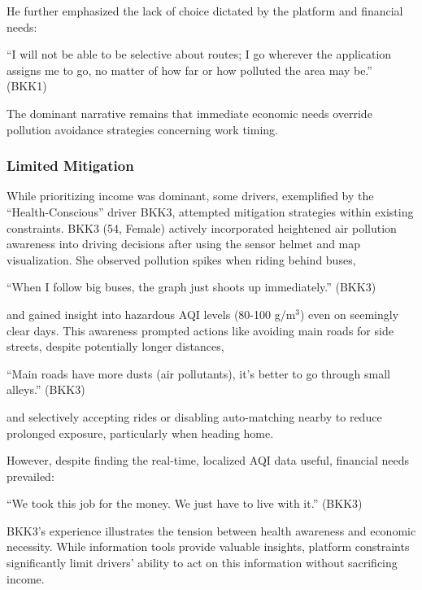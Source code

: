 \documentclass[sigconf,screen,natbib=true]{acmart}
\begin{document}
He further emphasized the lack of choice dictated by the platform and financial needs:

\begin{quoteb}
    ``I will not be able to be selective about routes; I go wherever the application assigns me to go, no matter of how far or how polluted the area may be.'' (BKK1)
\end{quoteb}





The dominant narrative remains that immediate economic needs override pollution avoidance strategies concerning work timing.

\subsubsection{Limited Mitigation}
While prioritizing income was dominant, some drivers, exemplified by the ``Health-Conscious'' driver BKK3, attempted mitigation strategies within existing constraints.
BKK3 (54, Female) actively incorporated heightened air pollution awareness into driving decisions after using the sensor helmet and map visualization.
She observed pollution spikes when riding behind buses,
\begin{quoteb}
    ``When I follow big buses, the graph just shoots up immediately.'' (BKK3)
\end{quoteb}

and gained insight into hazardous AQI levels (80-100 \textmu{}g/m$^3$) even on seemingly clear days. This awareness prompted actions like avoiding main roads for side streets, despite potentially longer distances,
\begin{quoteb}
    ``Main roads have more dusts (air pollutants), it’s better to go through small alleys.'' (BKK3)
\end{quoteb}

and selectively accepting rides or disabling auto-matching nearby to reduce prolonged exposure, particularly when heading home.



However, despite finding the real-time, localized AQI data useful, financial needs prevailed:

\begin{quoteb}
    ``We took this job for the money. We just have to live with it.'' (BKK3)
\end{quoteb}

BKK3's experience illustrates the tension between health awareness and economic necessity.
While information tools provide valuable insights, platform constraints significantly limit drivers' ability to act on this information without sacrificing income.
\end{document}
